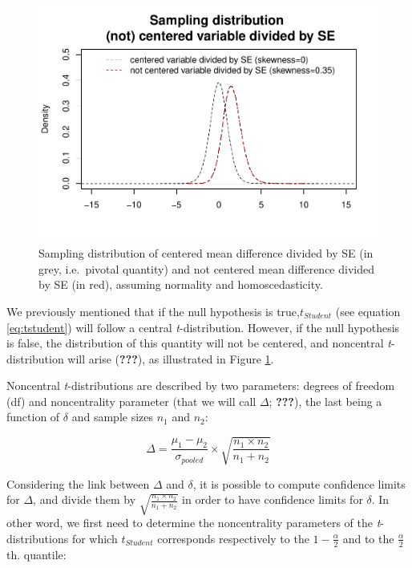 \documentclass[
  man,floatsintext]{apa6}
\begin{document}
\begin{figure}
\centering
\includegraphics{CI_files/figure-latex/SAMPLMEANDIFF3-1.pdf}
\caption{\label{fig:SAMPLMEANDIFF3}Sampling distribution of centered mean difference divided by SE (in grey, i.e.~pivotal quantity) and not centered mean difference divided by SE (in red), assuming normality and homoscedasticity.}
\end{figure}

We previously mentioned that if the null hypothesis is true,\(t_{Student}\) (see equation \eqref{eq:tstudent}) will follow a central \emph{t}-distribution. However, if the null hypothesis is false, the distribution of this quantity will not be centered, and noncentral \emph{t}-distribution will arise ({\textbf{???}}), as illustrated in Figure \ref{fig:SAMPLMEANDIFF3}.

Noncentral \emph{t}-distributions are described by two parameters: degrees of freedom (df) and noncentrality parameter (that we will call \(\Delta\); {\textbf{???}}), the last being a function of \(\delta\) and sample sizes \(n_1\) and \(n_2\):

\begin{equation}
\Delta = \frac{\mu_1-\mu_2}{\sigma_{pooled}} \times \sqrt{\frac{n_1 \times n_2}{n_1 + n_2}}
\label{eq:ncp}
\end{equation}

Considering the link between \(\Delta\) and \(\delta\), it is possible to compute confidence limits for \(\Delta\), and divide them by \(\sqrt{\frac{n_1 \times n_2}{n_1 + n_2}}\) in order to have confidence limits for \(\delta\). In other word, we first need to determine the noncentrality parameters of the \emph{t}-distributions for which \(t_{Student}\) corresponds respectively to the \(1-\frac{\alpha}{2}\) and to the \(\frac{\alpha}{2}\) th. quantile:
\end{document}

